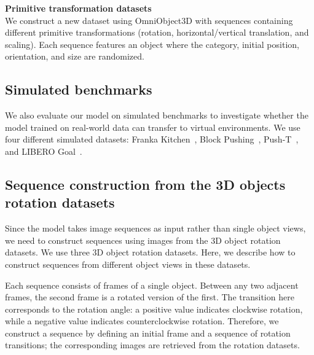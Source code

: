 \textbf{Primitive transformation datasets} \\
We construct a new dataset using OmniObject3D with sequences containing different primitive transformations (rotation, horizontal/vertical translation, and scaling). Each sequence features an object where the category, initial position, orientation, and size are randomized.

\subsection{Simulated benchmarks}
We also evaluate our model on simulated benchmarks to investigate whether the model trained on real-world data can transfer to virtual environments. We use four different simulated datasets: Franka Kitchen~\citep{gupta2019relay}, Block Pushing~\citep{florence2022implicit}, Push-T~\citep{chi2023diffusion}, and LIBERO Goal~\citep{liu2023libero}.

\subsection{Sequence construction from the 3D objects rotation datasets}
Since the model takes image sequences as input rather than single object views, we need to construct sequences using images from the 3D object rotation datasets. We use three 3D object rotation datasets. Here, we describe how to construct sequences from different object views in these datasets.

Each sequence consists of frames of a single object. Between any two adjacent frames, the second frame is a rotated version of the first. The transition here corresponds to the rotation angle: a positive value indicates clockwise rotation, while a negative value indicates counterclockwise rotation. Therefore, we construct a sequence by defining an initial frame and a sequence of rotation transitions; the corresponding images are retrieved from the rotation datasets.

